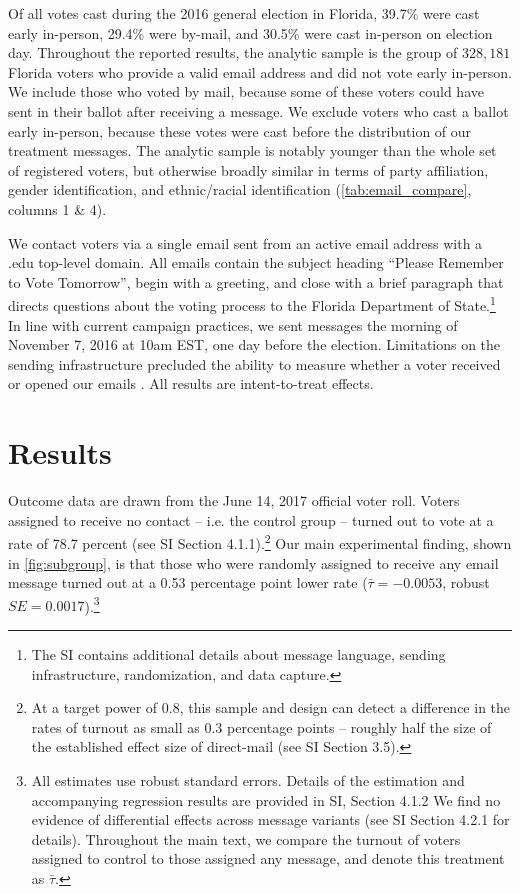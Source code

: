 \documentclass[12pt]{article}
\begin{document}
Of all votes cast during the 2016 general election in Florida, 39.7\%
were cast early in-person, 29.4\% were by-mail, and 30.5\% were cast
in-person on election day. Throughout the reported results, the
analytic sample is the group of $328,181$ Florida voters who provide a
valid email address and did not vote early in-person. We include those
who voted by mail, because some of these voters could have sent in
their ballot after receiving a message. We exclude voters who cast a
ballot early in-person, because these votes were cast before the
distribution of our treatment messages. The analytic sample is notably
younger than the whole set of registered voters, but otherwise broadly
similar in terms of party affiliation, gender identification, and
ethnic/racial identification (\autoref{tab:email_compare}, columns 1
\& 4).



We contact voters via a single email sent from an active email address
with a .edu top-level domain. All emails contain the subject heading
``Please Remember to Vote Tomorrow'', begin with a greeting, and close
with a brief paragraph that directs questions about the voting process
to the Florida Department of State.\footnote{The SI contains
  additional details about message language, sending infrastructure,
  randomization, and data capture.}  In line with current campaign
practices, we sent messages the morning of November 7, 2016 at 10am
EST, one day before the election. Limitations on the sending
infrastructure precluded the ability to measure whether a voter
received or opened our emails \citep{hughes2019}. All results are
intent-to-treat effects.

\section{Results}

Outcome data are drawn from the June 14, 2017 official voter roll.
Voters assigned to receive no contact -- i.e. the control group --
turned out to vote at a rate of 78.7 percent (see SI Section
4.1.1).\footnote{At a target power of 0.8, this sample and design can
  detect a difference in the rates of turnout as small as 0.3
  percentage points -- roughly half the size of the established effect
  size of direct-mail (see SI Section 3.5).}  Our main experimental
finding, shown in \autoref{fig:subgroup}, is that those who were
randomly assigned to receive any email message turned out at a 0.53
percentage point lower rate ($\bar{\tau} = -0.0053$, robust
$SE = 0.0017$).\footnote{All estimates use robust standard
  errors. Details of the estimation and accompanying regression
  results are provided in SI, Section 4.1.2 We find no evidence of
  differential effects across message variants (see SI Section 4.2.1
  for details). Throughout the main text, we compare the turnout of
  voters assigned to control to those assigned any message, and denote
  this treatment as $\bar{\tau}$. }
\end{document}
